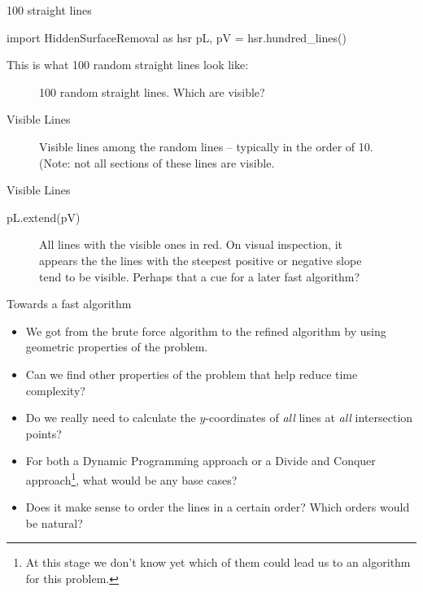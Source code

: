 \documentclass[ignorenonframetext,]{beamer}
\begin{document}
\begin{frame}[fragile]{100 straight lines}

  \begin{sympysilent}
    import HiddenSurfaceRemoval as hsr
    pL, pV = hsr.hundred_lines()
  \end{sympysilent}



  This is what 100 random straight lines look like:
  \begin{figure}
    \caption{100 random straight lines. Which are visible?}
    \centering
  \end{figure}
\end{frame}

\begin{frame}{Visible Lines}

  \begin{figure}
    \caption{Visible lines among the random lines -- typically in the
      order of 10. (Note: not all sections of these lines are visible.}
    \centering
  \end{figure}

\end{frame}

\begin{frame}[fragile]{Visible Lines}

  \begin{sympysilent}
    pL.extend(pV)
  \end{sympysilent}

  \begin{figure}
    \caption{All lines with the visible ones in red.   On visual inspection, it appears the the lines with the steepest
  positive or negative slope tend to be visible. Perhaps that a cue
  for a later fast algorithm?}
    \centering
  \end{figure}
\end{frame}

\begin{frame}{Towards a fast algorithm}

\begin{itemize}[<+->]
    \item We got from the brute force algorithm to the refined
      algorithm by using geometric properties of the problem. 
    \item Can we find other properties of the problem that help reduce
      time complexity? 
    \item Do we really need to calculate the $y$-coordinates of
      \emph{all} lines at \emph{all} intersection points? 
    \item For both a Dynamic Programming approach or a Divide and
      Conquer approach\footnote{At this stage we don't know yet which
        of them could lead us to an algorithm for this problem.}, 
      what would be any base cases?
    \item Does it make sense to order the lines in a certain order?
      Which orders would be natural? 
\end{itemize}
\end{frame}
\end{document}
